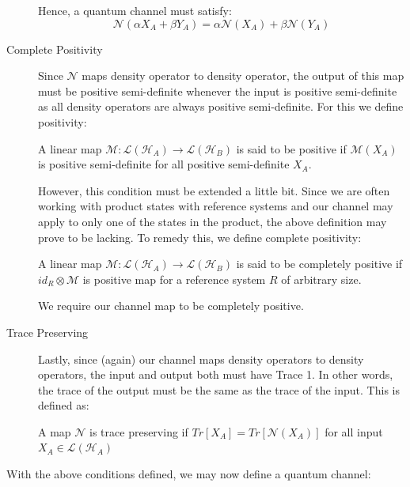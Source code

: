 \begin{description}
{        Hence, a quantum channel must satisfy:
        \begin{equation}
            \mathcal{N}(\alpha X_A + \beta Y_A) = \alpha \mathcal{N}(X_A) + \beta \mathcal{N}(Y_A)
        \end{equation}
        }
    \item[Complete Positivity] {
        Since $\mathcal{N}$ maps density operator to density operator, the output of this map must
        be positive semi-definite whenever the input is positive semi-definite as all density operators
        are always positive semi-definite. For this we define positivity:
        \begin{definition}[Positivity]
            A linear map $\mathcal{M} : \mathcal{L}(\mathcal{H}_A) \rightarrow \mathcal{L}(\mathcal{H}_B)$
            is said to be positive if $\mathcal{M}(X_A)$ is positive semi-definite for all positive
            semi-definite $X_A$.
        \end{definition}
        However, this condition must be extended a little bit. Since we are often working with product
        states with reference systems and our channel may apply to only one of the states in the product,
        the above definition may prove to be lacking. To remedy this, we define complete positivity:
        \begin{definition}
            A linear map $\mathcal{M} : \mathcal{L}(\mathcal{H}_A) \rightarrow \mathcal{L}(\mathcal{H}_B)$
            is said to be completely positive if $id_R \otimes \mathcal{M}$ is positive map for a reference
            system $R$ of arbitrary size.
        \end{definition}
        We require our channel map to be completely positive.
    }
    \item[Trace Preserving] {
        Lastly, since (again) our channel maps density operators to density operators, the input and output
        both must have Trace 1. In other words, the trace of the output must be the same as the trace of the
        input. This is defined as:
        \begin{definition}
            A map $\mathcal{N}$ is trace preserving if $Tr[X_A] = Tr[\mathcal{N}(X_A)]$ for all input $X_A \in \mathcal{L}(\mathcal{H}_A)$
        \end{definition}
    }
\end{description}

With the above conditions defined, we may now define a quantum channel:

